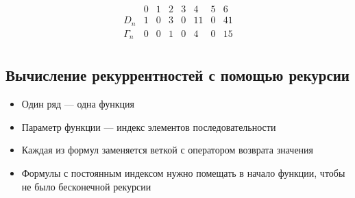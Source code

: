 $$
 \begin{array}{c|ccccccc}
           & 0 & 1 & 2 & 3 & 4  & 5  & 6  \\
  \hline
  D_n      & 1 & 0 & 3 & 0 & 11 & 0  & 41 \\
  \Gamma_n & 0 & 0 & 1 & 0 & 4  & 0  & 15 \\
 \end{array}
$$

\subsection{Вычисление рекуррентностей с помощью рекурсии}

\begin{itemize}
\item Один ряд --- одна функция
\item Параметр функции --- индекс элементов последовательности
\item Каждая из формул заменяется веткой с оператором возврата значения
\item Формулы с постоянным индексом нужно помещать в начало функции,
      чтобы не было бесконечной рекурсии
\end{itemize}
